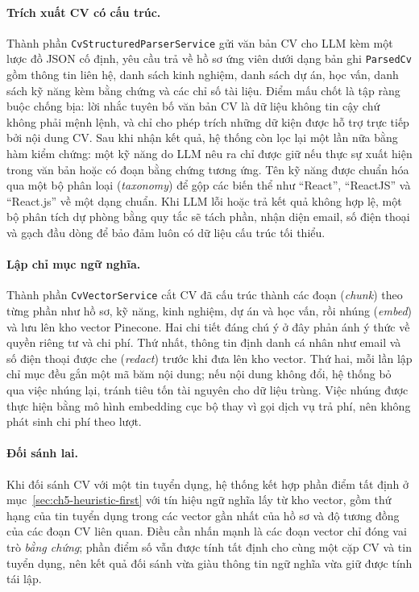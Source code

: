 \documentclass[../DoAn.tex]{subfiles}
\begin{document}
\paragraph{Trích xuất CV có cấu trúc.} Thành phần \texttt{CvStructuredParserService} gửi văn bản CV cho LLM kèm một lược đồ JSON cố định, yêu cầu trả về hồ sơ ứng viên dưới dạng bản ghi \texttt{ParsedCv} gồm thông tin liên hệ, danh sách kinh nghiệm, danh sách dự án, học vấn, danh sách kỹ năng kèm bằng chứng và các chỉ số tài liệu. Điểm mấu chốt là tập ràng buộc chống bịa: lời nhắc tuyên bố văn bản CV là dữ liệu không tin cậy chứ không phải mệnh lệnh, và chỉ cho phép trích những dữ kiện được hỗ trợ trực tiếp bởi nội dung CV. Sau khi nhận kết quả, hệ thống còn lọc lại một lần nữa bằng hàm kiểm chứng: một kỹ năng do LLM nêu ra chỉ được giữ nếu thực sự xuất hiện trong văn bản hoặc có đoạn bằng chứng tương ứng. Tên kỹ năng được chuẩn hóa qua một bộ phân loại (\textit{taxonomy}) để gộp các biến thể như ``React'', ``ReactJS'' và ``React.js'' về một dạng chuẩn. Khi LLM lỗi hoặc trả kết quả không hợp lệ, một bộ phân tích dự phòng bằng quy tắc sẽ tách phần, nhận diện email, số điện thoại và gạch đầu dòng để bảo đảm luôn có dữ liệu cấu trúc tối thiểu.

\paragraph{Lập chỉ mục ngữ nghĩa.} Thành phần \texttt{CvVectorService} cắt CV đã cấu trúc thành các đoạn (\textit{chunk}) theo từng phần như hồ sơ, kỹ năng, kinh nghiệm, dự án và học vấn, rồi nhúng (\textit{embed}) và lưu lên kho vector Pinecone. Hai chi tiết đáng chú ý ở đây phản ánh ý thức về quyền riêng tư và chi phí. Thứ nhất, thông tin định danh cá nhân như email và số điện thoại được che (\textit{redact}) trước khi đưa lên kho vector. Thứ hai, mỗi lần lập chỉ mục đều gắn một mã băm nội dung; nếu nội dung không đổi, hệ thống bỏ qua việc nhúng lại, tránh tiêu tốn tài nguyên cho dữ liệu trùng. Việc nhúng được thực hiện bằng mô hình embedding cục bộ thay vì gọi dịch vụ trả phí, nên không phát sinh chi phí theo lượt.

\paragraph{Đối sánh lai.} Khi đối sánh CV với một tin tuyển dụng, hệ thống kết hợp phần điểm tất định ở mục~\ref{sec:ch5-heuristic-first} với tín hiệu ngữ nghĩa lấy từ kho vector, gồm thứ hạng của tin tuyển dụng trong các vector gần nhất của hồ sơ và độ tương đồng của các đoạn CV liên quan. Điều cần nhấn mạnh là các đoạn vector chỉ đóng vai trò \emph{bằng chứng}; phần điểm số vẫn được tính tất định cho cùng một cặp CV và tin tuyển dụng, nên kết quả đối sánh vừa giàu thông tin ngữ nghĩa vừa giữ được tính tái lập.
\end{document}
